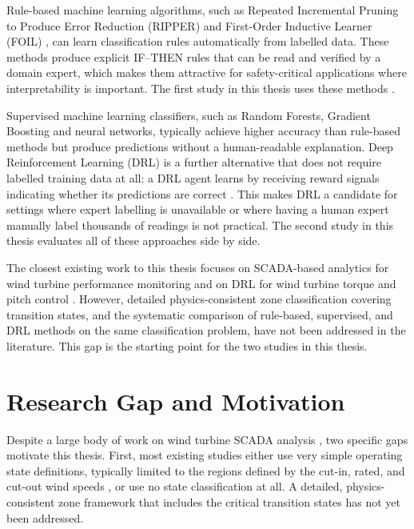 Rule-based machine learning algorithms, such as Repeated Incremental Pruning to Produce
Error Reduction (RIPPER) \citep{cohen1995} and First-Order Inductive Learner (FOIL)
\citep{quinlan1990}, can learn classification rules automatically from labelled data.
These methods produce explicit IF--THEN rules that can be read and verified by a domain
expert, which makes them attractive for safety-critical applications where interpretability
is important. The first study in this thesis uses these methods \citep{indrekvam2026}.

Supervised machine learning classifiers, such as Random Forests, Gradient Boosting and
neural networks, typically achieve higher accuracy than rule-based methods but produce
predictions without a human-readable explanation. Deep Reinforcement Learning (DRL) is a
further alternative that does not require labelled training data at all: a DRL agent
learns by receiving reward signals indicating whether its predictions are correct \citep{mnih2015}. This
makes DRL a candidate for settings where expert labelling is unavailable or where having a human expert manually label
thousands of readings is not practical.
The second study in this thesis evaluates all of these approaches side by side.

The closest existing work to this thesis focuses on SCADA-based analytics for wind turbine
performance monitoring \citep{pandit2024} and on DRL for wind turbine torque and pitch
control \citep{xie2023, didier2022}. However, detailed physics-consistent zone
classification covering transition states, and the systematic comparison of rule-based,
supervised, and DRL methods on the same classification problem, have not been addressed
in the literature. This gap is the starting point for the two studies in this thesis.

\section{Research Gap and Motivation}
\label{sec:intro:gap}

Despite a large body of work on wind turbine SCADA analysis \citep{pandit2024}, two
specific gaps motivate this thesis. First, most existing studies either use very simple
operating state definitions, typically limited to the regions defined by the cut-in, rated,
and cut-out wind speeds \citep{manwell2009}, or use no state classification at all. A detailed, physics-consistent zone framework that
includes the critical transition states has not yet been addressed.

